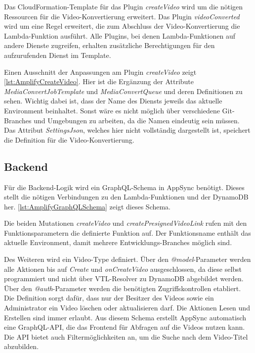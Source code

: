 Das CloudFormation-Template für das Plugin \textit{createVideo} wird um die nötigen Ressourcen für die Video-Konvertierung erweitert. Das Plugin \textit{videoConverted} wird um eine Regel erweitert, die zum Abschluss der Video-Konvertierung die Lambda-Funktion ausführt. Alle Plugins, bei denen Lambda-Funktionen auf andere Dienste zugreifen, erhalten zusätzliche Berechtigungen für den aufzurufenden Dienst im Template.

Einen Ausschnitt der Anpassungen am Plugin \textit{createVideo} zeigt \autoref{lst:AmplifyCreateVideo}. Hier ist die Ergänzung der Attribute \textit{MediaConvertJobTemplate} und \textit{MediaConvertQueue} und deren Definitionen zu sehen. Wichtig dabei ist, dass der Name des Diensts jeweils das aktuelle Environment beinhaltet. Sonst wäre es nicht möglich über verschiedene Git-Branches und Umgebungen zu arbeiten, da die Namen eindeutig sein müssen. Das Attribut \textit{SettingsJson}, welches hier nicht vollständig dargestellt ist, speichert die Definition für die Video-Konvertierung.


\subsection{Backend}

Für die Backend-Logik wird ein GraphQL-Schema in AppSync benötigt. Dieses stellt die nötigen Verbindungen zu den Lambda-Funktionen und der DynamoDB her. \autoref{lst:AmplifyGraphQLSchema} zeigt dieses Schema.

Die beiden Mutationen \textit{createVideo} und \textit{createPresignedVideoLink} rufen mit den Funktionsparametern die definierte Funktion auf. Der Funktionsname enthält das aktuelle Environment, damit mehrere Entwicklungs-Branches möglich sind.

Des Weiteren wird ein Video-Type definiert. Über den \textit{@model}-Parameter werden alle Aktionen bis auf \textit{Create} und \textit{onCreateVideo} ausgeschlossen, da diese selbst programmiert und nicht über VTL-Resolver zu DynamoDB abgebildet werden. Über den \textit{@auth}-Parameter werden die benötigten Zugriffskontrollen etabliert. Die Definition sorgt dafür, dass nur der Besitzer des Videos sowie ein Administrator ein Video löschen oder aktualisieren darf. Die Aktionen Lesen und Erstellen sind immer erlaubt. Aus diesem Schema erstellt AppSync automatisch eine GraphQL-API, die das Frontend für Abfragen auf die Videos nutzen kann. Die API bietet auch Filtermöglichkeiten an, um die Suche nach dem Video-Titel abzubilden.

